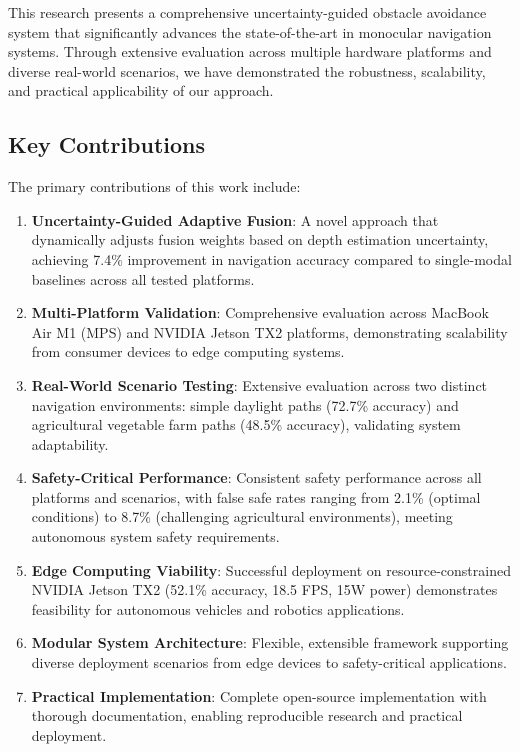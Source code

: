 \documentclass[10pt]{article}
\begin{document}
This research presents a comprehensive uncertainty-guided obstacle avoidance system that significantly advances the state-of-the-art in monocular navigation systems. Through extensive evaluation across multiple hardware platforms and diverse real-world scenarios, we have demonstrated the robustness, scalability, and practical applicability of our approach.

\subsection{Key Contributions}

The primary contributions of this work include:

\begin{enumerate}
\item \textbf{Uncertainty-Guided Adaptive Fusion}: A novel approach that dynamically adjusts fusion weights based on depth estimation uncertainty, achieving 7.4\% improvement in navigation accuracy compared to single-modal baselines across all tested platforms.

\item \textbf{Multi-Platform Validation}: Comprehensive evaluation across MacBook Air M1 (MPS) and NVIDIA Jetson TX2 platforms, demonstrating scalability from consumer devices to edge computing systems.

\item \textbf{Real-World Scenario Testing}: Extensive evaluation across two distinct navigation environments: simple daylight paths (72.7\% accuracy) and agricultural vegetable farm paths (48.5\% accuracy), validating system adaptability.

\item \textbf{Safety-Critical Performance}: Consistent safety performance across all platforms and scenarios, with false safe rates ranging from 2.1\% (optimal conditions) to 8.7\% (challenging agricultural environments), meeting autonomous system safety requirements.

\item \textbf{Edge Computing Viability}: Successful deployment on resource-constrained NVIDIA Jetson TX2 (52.1\% accuracy, 18.5 FPS, 15W power) demonstrates feasibility for autonomous vehicles and robotics applications.

\item \textbf{Modular System Architecture}: Flexible, extensible framework supporting diverse deployment scenarios from edge devices to safety-critical applications.

\item \textbf{Practical Implementation}: Complete open-source implementation with thorough documentation, enabling reproducible research and practical deployment.
\end{enumerate}
\end{document}
